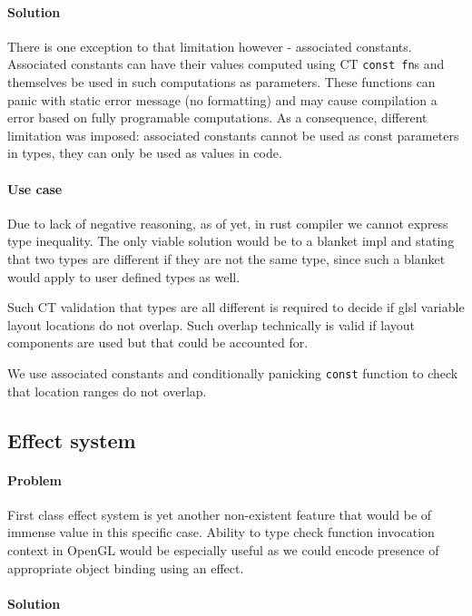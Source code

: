 \paragraph{Solution}

There is one exception to that limitation however - associated constants. Associated constants can have their values computed using CT \texttt{const fn}s and themselves be used in such computations as parameters.
These functions can panic with static error message (no formatting) and may cause compilation a error based on fully programable computations.
As a consequence, different limitation was imposed: associated constants cannot be used as const parameters in types, they can only be used as values in code.

\paragraph{Use case}

Due to lack of negative reasoning, as of yet, in rust compiler we cannot express type inequality.
The only viable solution would be to a blanket impl and stating that two types are different if they are not the same type, since such a blanket would apply to user defined types as well.

Such CT validation that types are all different is required to decide if glsl variable layout locations do not overlap.
Such overlap technically is valid if layout components are used but that could be accounted for.

We use associated constants and conditionally panicking \texttt{const} function to check that location ranges do not overlap.

\subsection{Effect system}

\paragraph{Problem}

First class effect system is yet another non-existent feature that would be of immense value in this specific case.
Ability to type check function invocation context in OpenGL would be especially useful as we could encode presence of appropriate object binding using an effect.

\paragraph{Solution}

